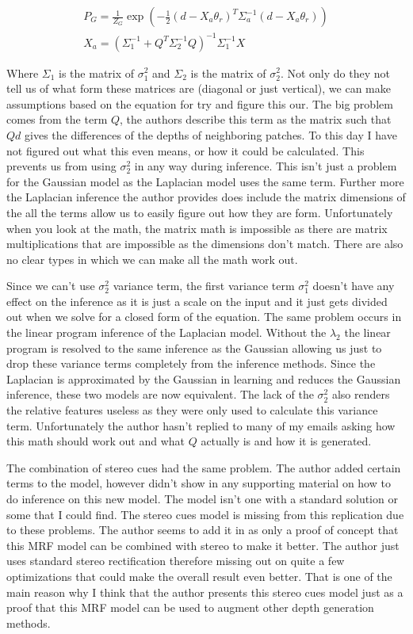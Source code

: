 \documentclass[journal]{IEEEtran}
\begin{document}
\begin{eqnarray}
\label{eq:stdgaussian}
	P_G = \frac{1}{Z_G} \exp{\left(-\frac{1}{2}(d-X_a\theta_r)^T\Sigma_a^{-1}(d-X_a\theta_r)\right)} \\
	X_a = (\Sigma_1^{-1}+Q^T\Sigma_2^{-1}Q)^{-1}\Sigma_1^{-1}X \nonumber
\end{eqnarray}

Where $\Sigma_1$ is the matrix of $\sigma^2_1$ and $\Sigma_2$ is the matrix of $\sigma^2_2$. Not only do they not tell us of what form these matrices are (diagonal or just vertical), we can make assumptions based on the equation for try and figure this our. The big problem comes from the term $Q$, the authors describe this term as the matrix such that $Qd$ gives the differences of the depths of neighboring patches. To this day I have not figured out what this even means, or how it could be calculated. This prevents us from using $\sigma^2_2$ in any way during inference. This isn't just a problem for the Gaussian model as the Laplacian model uses the same term. Further more the Laplacian inference the author provides does include the matrix dimensions of the all the terms allow us to easily figure out how they are form. Unfortunately when you look at the math, the matrix math is impossible as there are matrix multiplications that are impossible as the dimensions don't match. There are also no clear types in which we can make all the math work out.

Since we can't use $\sigma^2_2$ variance term, the first variance term $\sigma^2_1$ doesn't have any effect on the inference as it is just a scale on the input and it just gets divided out when we solve for a closed form of the equation. The same problem occurs in the linear program inference of the Laplacian model. Without the $\lambda_2$ the linear program is resolved to the same inference as the Gaussian allowing us just to drop these variance terms completely from the inference methods. Since the Laplacian is approximated by the Gaussian in learning and reduces the Gaussian inference, these two models are now equivalent. The lack of the $\sigma^2_2$ also renders the relative features useless as they were only used to calculate this variance term. Unfortunately the author hasn't replied to many of my emails asking how this math should work out and what $Q$ actually is and how it is generated.

The combination of stereo cues had the same problem. The author added certain terms to the model, however didn't show in any supporting material on how to do inference on this new model. The model isn't one with a standard solution or some that I could find. The stereo cues model is missing from this replication due to these problems. The author seems to add it in as only a proof of concept that this MRF model can be combined with stereo to make it better. The author just uses standard stereo rectification therefore missing out on quite a few optimizations that could make the overall result even better. That is one of the main reason why I think that the author presents this stereo cues model just as a proof that this MRF model can be used to augment other depth generation methods.
\end{document}

